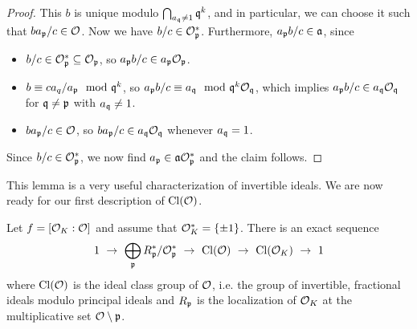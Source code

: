 \begin{proof}
    This $b$ is unique modulo $\bigcap_{a_\q \neq 1} \q^k$, and in particular, we can choose it such that $ba_\p/c \in \O$.
    Now we have $b/c \in \O_\p^*$.
    Furthermore, $a_\p b/c \in \a$, since
    \begin{itemize}
        \item $b/c \in \O_\p^* \subseteq \O_\p$, so $a_\p b/c \in a_\p\O_\p$.
        \item $b \equiv ca_q/a_\p \mod \q^k$, so $a_\p b/c \equiv a_\q \mod \q^k\O_\q$, which implies $a_\p b/c \in a_\q\O_\q$ for $\q \neq \p$ with $a_\q \neq 1$.
        \item $ba_\p/c \in \O$, so $ba_\p/c \in a_\q\O_\q$ whenever $a_\q = 1$.
    \end{itemize}
    Since $b/c \in \O_\p^*$, we now find $a_\p \in \a\O_\p^*$ and the claim follows.
\end{proof}
This lemma is a very useful characterization of invertible ideals.
We are now ready for our first description of $\Cl(\O)$.
\begin{lemma}
    Let $f = [\O_K : \O]$ and assume that $\O_K^* = \{ \pm 1 \}$.
    There is an exact sequence
    \begin{equation*}
        1 \ \to \ \bigoplus_\p R_\p^*/\O_\p^* \ \to \ \Cl(\O) \ \to \ \Cl(\O_K) \ \to \ 1
    \end{equation*}
    where $\Cl(\O)$ is the ideal class group of $\O$, i.e. the group of invertible, fractional ideals modulo principal ideals and $R_\p$ is the localization of $\O_K$ at the multiplicative set $\O \setminus \p$.
\end{lemma}
